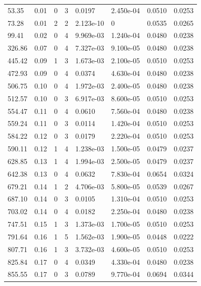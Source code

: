 \documentclass[preview]{standalone}
\begin{document}
{{\begin{tabular}{L{1.2cm}C{1.2cm} C{0.3cm}C{0.5cm} C{1.4cm}C{1.4cm} C{1.4cm}C{1.4cm}}
  53.35  &  0.01  & 0     &  3 &  0.0197  & 2.450e-04  & 0.0510 &  0.0253   \\ 
  73.28  &  0.01  & 2     &  2 &  2.123e-10  & 0  & 0.0535 &  0.0265   \\ 
  99.41  &  0.02  & 0     &  4 &  9.969e-03  & 1.240e-04  & 0.0480 &  0.0238   \\ 
  326.86  &  0.07  & 0     &  4 &  7.327e-03  & 9.100e-05  & 0.0480 &  0.0238   \\ 
  445.42  &  0.09  & 1     &  3 &  1.673e-03  & 2.100e-05  & 0.0510 &  0.0253   \\ 
  472.93  &  0.09  & 0     &  4 &  0.0374  & 4.630e-04  & 0.0480 &  0.0238   \\ 
  506.75  &  0.10  & 0     &  4 &  1.972e-03  & 2.400e-05  & 0.0480 &  0.0238   \\ 
  512.57  &  0.10  & 0     &  3 &  6.917e-03  & 8.600e-05  & 0.0510 &  0.0253   \\ 
  554.47  &  0.11  & 0     &  4 &  0.0610  & 7.560e-04  & 0.0480 &  0.0238   \\ 
  559.24  &  0.11  & 0     &  3 &  0.0114  & 1.420e-04  & 0.0510 &  0.0253   \\ 
  584.22  &  0.12  & 0     &  3 &  0.0179  & 2.220e-04  & 0.0510 &  0.0253   \\ 
  590.11  &  0.12  & 1     &  4 &  1.238e-03  & 1.500e-05  & 0.0479 &  0.0237   \\ 
  628.85  &  0.13  & 1     &  4 &  1.994e-03  & 2.500e-05  & 0.0479 &  0.0237   \\ 
  642.38  &  0.13  & 0     &  4 &  0.0632  & 7.830e-04  & 0.0654 &  0.0324   \\ 
  679.21  &  0.14  & 1     &  2 &  4.706e-03  & 5.800e-05  & 0.0539 &  0.0267   \\ 
  687.10  &  0.14  & 0     &  3 &  0.0105  & 1.310e-04  & 0.0510 &  0.0253   \\ 
  703.02  &  0.14  & 0     &  4 &  0.0182  & 2.250e-04  & 0.0480 &  0.0238   \\ 
  747.51  &  0.15  & 1     &  3 &  1.373e-03  & 1.700e-05  & 0.0510 &  0.0253   \\ 
  791.64  &  0.16  & 1     &  5 &  1.562e-03  & 1.900e-05  & 0.0448 &  0.0222   \\ 
  807.71  &  0.16  & 1     &  3 &  3.732e-03  & 4.600e-05  & 0.0510 &  0.0253   \\ 
  825.84  &  0.17  & 0     &  4 &  0.0349  & 4.330e-04  & 0.0480 &  0.0238   \\ 
  855.55  &  0.17  & 0     &  3 &  0.0789  & 9.770e-04  & 0.0694 &  0.0344   \\ 

\end{tabular}}}
\end{document}

